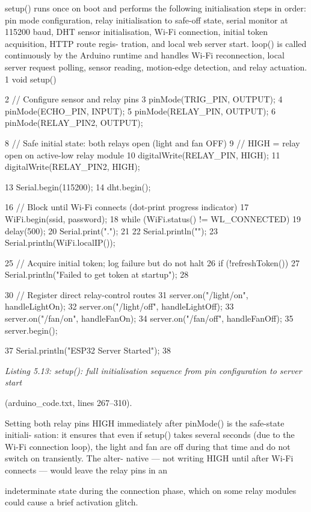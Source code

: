 setup() runs once on boot and performs the following initialisation steps in order: pin
mode conﬁguration, relay initialisation to safe-off state, serial monitor at 115200 baud,
DHT sensor initialisation, Wi-Fi connection, initial token acquisition, HTTP route regis-
tration, and local web server start. loop() is called continuously by the Arduino runtime
and handles Wi-Fi reconnection, local server request polling, sensor reading, motion-edge
detection, and relay actuation.
1 void setup() {
2 // Configure sensor and relay pins
3 pinMode(TRIG\_PIN, OUTPUT);
4 pinMode(ECHO\_PIN, INPUT);
5 pinMode(RELAY\_PIN, OUTPUT);
6 pinMode(RELAY\_PIN2, OUTPUT);






8 // Safe initial state: both relays open (light and fan OFF)
9 // HIGH = relay open on active-low relay module
10 digitalWrite(RELAY\_PIN, HIGH);
11 digitalWrite(RELAY\_PIN2, HIGH);

13 Serial.begin(115200);
14 dht.begin();

16 // Block until Wi-Fi connects (dot-print progress indicator)
17 WiFi.begin(ssid, password);
18 while (WiFi.status() != WL\_CONNECTED) {
19 delay(500);
20 Serial.print(".");
21 }
22 Serial.println("\nConnected");
23 Serial.println(WiFi.localIP());


25 // Acquire initial token; log failure but do not halt
26 if (!refreshToken()) {
27 Serial.println("Failed to get token at startup");
28 }

30 // Register direct relay-control routes
31 server.on("/light/on", handleLightOn);
32 server.on("/light/off", handleLightOff);
33 server.on("/fan/on", handleFanOn);
34 server.on("/fan/off", handleFanOff);
35 server.begin();

37 Serial.println("ESP32 Server Started");
38 }


\textit{Listing 5.13:      setup():   full initialisation sequence from pin conﬁguration to server start}

(arduino\_code.txt, lines 267--310).


Setting both relay pins HIGH immediately after pinMode() is the safe-state initiali-
sation: it ensures that even if setup() takes several seconds (due to the Wi-Fi connection
loop), the light and fan are off during that time and do not switch on transiently. The alter-
native --- not writing HIGH until after Wi-Fi connects --- would leave the relay pins in an



indeterminate state during the connection phase, which on some relay modules could cause
a brief activation glitch.

